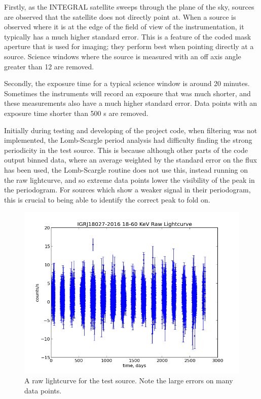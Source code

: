 Firstly, as the INTEGRAL satellite sweeps through the plane of the sky, sources are observed that the satellite does not directly point at. When a source is observed where it is at the edge of the field of view of the instrumentation, it typically has a much higher standard error. This is a feature of the coded mask aperture that is used for imaging; they perform best when pointing directly at a source. Science windows where the source is measured with an off axis angle greater than 12 \textdegree{} are removed. 

Secondly, the exposure time for a typical science window is around 20 minutes.  Sometimes the instruments will record an exposure that was much shorter, and these measurements also have a much higher standard error. Data points with an exposure time shorter than 500 s are removed. 

Initially during testing and developing of the project code, when filtering was not implemented, the Lomb-Scargle period analysis had difficulty finding the strong periodicity in the test source. This is because although other parts of the code output binned data, where an average weighted by the standard error on the flux has been used, the Lomb-Scargle routine does not use this, instead running on the raw lightcurve, and so extreme data points lower the visibility of the peak in the periodogram. For sources which show a weaker signal in their periodogram, this is crucial to being able to identify the correct peak to fold on.

\begin{figure}[h!]
\centering
\includegraphics[width=130mm]{gfx/Fig1.png}
\caption{A raw lightcurve for the test source. Note the large errors on many data points.}
\label{Figure 1}
\end{figure}

